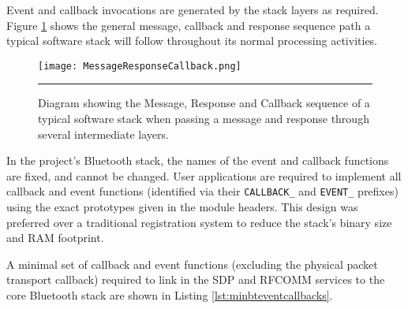 Event and callback invocations are generated by the stack layers as required. Figure \ref{fig:messageresponsecallback} shows the general message, callback and response sequence path a typical software stack will follow throughout its normal processing activities.

\begin{figure}[tbph]
	\vspace{1em}
	\centering
		\texttt{[image: MessageResponseCallback.png]}
	\rule{35em}{0.5pt}
	\caption[Diagram of the Message, Response and Callback sequence]{Diagram showing the Message, Response and Callback sequence of a typical software stack when passing a message and response through several intermediate layers.}
	\label{fig:messageresponsecallback}
\end{figure}

In the project's Bluetooth stack, the names of the event and callback functions are fixed, and cannot be changed. User applications are required to implement all callback and event functions (identified via their \lstinline{CALLBACK_} and \lstinline{EVENT_} prefixes) using the exact prototypes given in the module headers. This design was preferred over a traditional registration system to reduce the stack's binary size and RAM footprint.

A minimal set of callback and event functions (excluding the physical packet transport callback) required to link in the SDP and RFCOMM services to the core Bluetooth stack are shown in Listing \ref{lst:minbteventcallbacks}.



